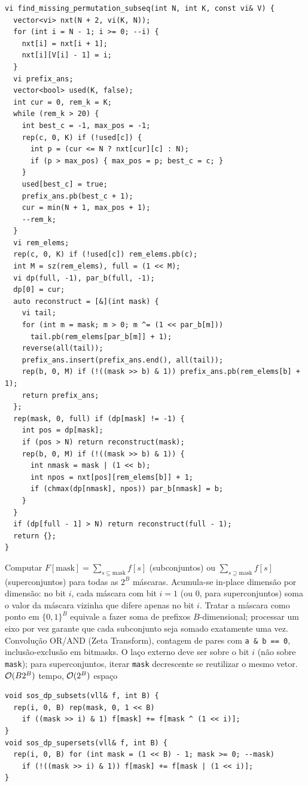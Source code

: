 \begin{lstlisting}
vi find_missing_permutation_subseq(int N, int K, const vi& V) {
  vector<vi> nxt(N + 2, vi(K, N));
  for (int i = N - 1; i >= 0; --i) {
    nxt[i] = nxt[i + 1];
    nxt[i][V[i] - 1] = i;
  }
  vi prefix_ans;
  vector<bool> used(K, false);
  int cur = 0, rem_k = K;
  while (rem_k > 20) {
    int best_c = -1, max_pos = -1;
    rep(c, 0, K) if (!used[c]) {
      int p = (cur <= N ? nxt[cur][c] : N);
      if (p > max_pos) { max_pos = p; best_c = c; }
    }
    used[best_c] = true;
    prefix_ans.pb(best_c + 1);
    cur = min(N + 1, max_pos + 1);
    --rem_k;
  }
  vi rem_elems;
  rep(c, 0, K) if (!used[c]) rem_elems.pb(c);
  int M = sz(rem_elems), full = (1 << M);
  vi dp(full, -1), par_b(full, -1);
  dp[0] = cur;
  auto reconstruct = [&](int mask) {
    vi tail;
    for (int m = mask; m > 0; m ^= (1 << par_b[m]))
      tail.pb(rem_elems[par_b[m]] + 1);
    reverse(all(tail));
    prefix_ans.insert(prefix_ans.end(), all(tail));
    rep(b, 0, M) if (!((mask >> b) & 1)) prefix_ans.pb(rem_elems[b] + 1);
    return prefix_ans;
  };
  rep(mask, 0, full) if (dp[mask] != -1) {
    int pos = dp[mask];
    if (pos > N) return reconstruct(mask);
    rep(b, 0, M) if (!((mask >> b) & 1)) {
      int nmask = mask | (1 << b);
      int npos = nxt[pos][rem_elems[b]] + 1;
      if (chmax(dp[nmask], npos)) par_b[nmask] = b;
    }
  }
  if (dp[full - 1] > N) return reconstruct(full - 1);
  return {};
}
\end{lstlisting}

\algobox
  {Computar $F[\text{mask}] = \sum_{s \subseteq \text{mask}} f[s]$ (subconjuntos) ou $\sum_{s \supseteq \text{mask}} f[s]$ (superconjuntos) para todas as $2^B$ máscaras.}
  {Acumula-se in-place dimensão por dimensão: no bit $i$, cada máscara com bit $i = 1$ (ou $0$, para superconjuntos) soma o valor da máscara vizinha que difere apenas no bit $i$.}
  {Tratar a máscara como ponto em $\{0, 1\}^B$ equivale a fazer soma de prefixos $B$-dimensional; processar um eixo por vez garante que cada subconjunto seja somado exatamente uma vez.}
  {Convolução OR/AND (Zeta Transform), contagem de pares com \texttt{a \& b == 0}, inclusão-exclusão em bitmasks.}
  {O laço externo deve ser sobre o bit $i$ (não sobre \texttt{mask}); para superconjuntos, iterar \texttt{mask} decrescente se reutilizar o mesmo vetor.}
  {$\mathcal{O}(B 2^B)$ tempo, $\mathcal{O}(2^B)$ espaço}

\begin{lstlisting}
void sos_dp_subsets(vll& f, int B) {
  rep(i, 0, B) rep(mask, 0, 1 << B)
    if ((mask >> i) & 1) f[mask] += f[mask ^ (1 << i)];
}
void sos_dp_supersets(vll& f, int B) {
  rep(i, 0, B) for (int mask = (1 << B) - 1; mask >= 0; --mask)
    if (!((mask >> i) & 1)) f[mask] += f[mask | (1 << i)];
}
\end{lstlisting}

